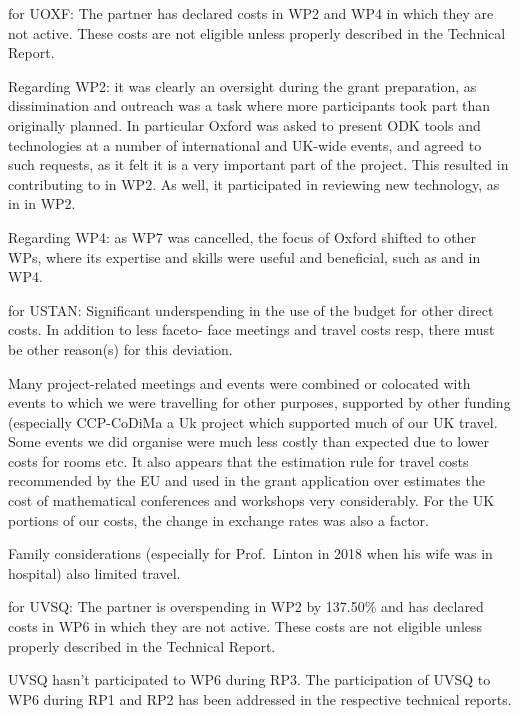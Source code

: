 for UOXF:
The partner has declared costs in WP2 and WP4 in which they are not active. These costs are
not eligible unless properly described in the Technical Report.

Regarding WP2: it was clearly an oversight during the grant preparation, as dissimination and outreach was a task where more participants took part than originally planned. In particular Oxford was asked to present ODK tools and technologies at a number of international and UK-wide events,
and agreed to such requests, as it felt it is a very important part of the project. This resulted in contributing to  in WP2. As well, it participated in reviewing new technology, as in  in WP2.

Regarding WP4: as WP7 was cancelled, the focus of Oxford shifted to other WPs, where its expertise and skills were useful and beneficial, such as  and  in WP4.


for USTAN:
Significant underspending in the use of the budget for other direct costs. In addition to less faceto-
face meetings and travel costs resp, there must be other reason(s) for
this deviation.

Many project-related meetings and events were combined or colocated
with events to which we were travelling for other purposes, supported
by other funding (especially CCP-CoDiMa a Uk project which supported
much of our UK travel. Some events we did organise were much less
costly than expected due to lower costs for rooms etc. It also appears
that the  estimation rule for travel costs recommended by the EU and
used in the grant application over estimates the cost of mathematical
conferences and workshops very considerably. For the UK portions of
our costs, the change in exchange rates was also a factor.

Family considerations (especially for Prof.~Linton in 2018 when his
wife was in hospital) also limited travel.




for UVSQ:
The partner is overspending in WP2 by 137.50\% and has declared costs in WP6 in which they
are not active. These costs are not eligible unless properly described in the Technical Report.

UVSQ hasn't participated to WP6 during RP3. The participation of UVSQ
to WP6 during RP1 and RP2 has been addressed in the respective technical reports.

